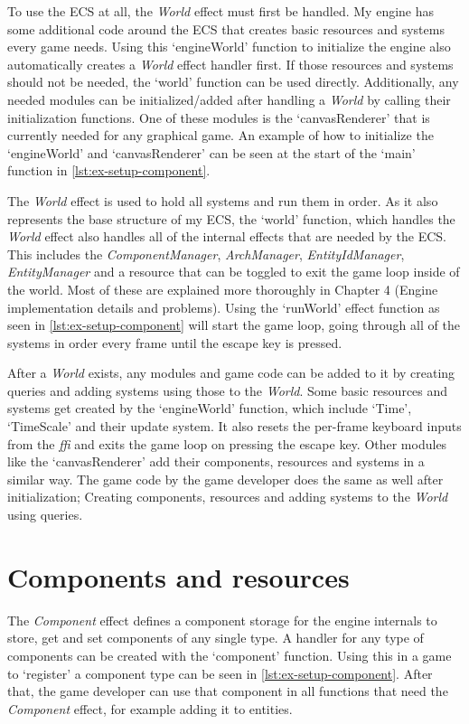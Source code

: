 To use the ECS at all, the \textit{World} effect must first be handled. My engine has some additional code around the ECS that creates basic resources and systems every game needs. Using this `engineWorld' function to initialize the engine also automatically creates a \textit{World} effect handler first. If those resources and systems should not be needed, the `world' function can be used directly. Additionally, any needed modules can be initialized/added after handling a \textit{World} by calling their initialization functions. One of these modules is the `canvasRenderer' that is currently needed for any graphical game. An example of how to initialize the `engineWorld' and `canvasRenderer' can be seen at the start of the `main' function in \cref{lst:ex-setup-component}.

The \textit{World} effect is used to hold all systems and run them in order. As it also represents the base structure of my ECS, the `world' function, which handles the \textit{World} effect also handles all of the internal effects that are needed by the ECS. This includes the \textit{ComponentManager}, \textit{ArchManager}, \textit{EntityIdManager}, \textit{EntityManager} and a resource that can be toggled to exit the game loop inside of the world. Most of these are explained more thoroughly in Chapter 4 (Engine implementation details and problems). Using the `runWorld' effect function as seen in \cref{lst:ex-setup-component} will start the game loop, going through all of the systems in order every frame until the escape key is pressed.

After a \textit{World} exists, any modules and game code can be added to it by creating queries and adding systems using those to the \textit{World}. Some basic resources and systems get created by the `engineWorld' function, which include `Time', `TimeScale' and their update system. It also resets the per-frame keyboard inputs from the \textit{ffi} and exits the game loop on pressing the escape key. Other modules like the `canvasRenderer' add their components, resources and systems in a similar way. The game code by the game developer does the same as well after initialization; Creating components, resources and adding systems to the \textit{World} using queries.

\section{Components and resources}

The \textit{Component} effect defines a component storage for the engine internals to store, get and set components of any single type. A handler for any type of components can be created with the `component' function. Using this in a game to `register' a component type can be seen in \cref{lst:ex-setup-component}. After that, the game developer can use that component in all functions that need the \textit{Component} effect, for example adding it to entities.

